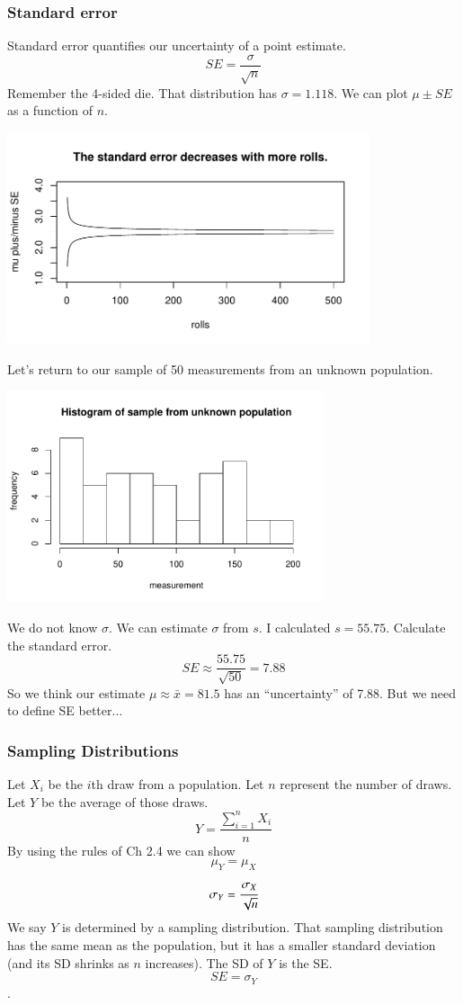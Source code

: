 \begin{frame}
\frametitle{Standard error}
Standard error quantifies our uncertainty of a point estimate.
$$SE = \frac{\sigma}{\sqrt{n}} $$
\pause
Remember the 4-sided die. That distribution has $\sigma = 1.118$. We can plot $\mu \pm SE$ as a function of $n$.
\begin{center}
\includegraphics[width=0.8\textwidth]{4-1_var_in_est/figures/running_mean_4sided_die/running_die_SE.pdf}
\end{center}
\end{frame}


\begin{frame}
Let's return to our sample of 50 measurements from an unknown population.
\begin{center}
\includegraphics[width=0.7\textwidth]{4-1_var_in_est/figures/running_mean_4sided_die/weight_hist.pdf}
\end{center}
We do not know $\sigma$. \pause We can estimate $\sigma$ from $s$. \pause I calculated $s=55.75$.
Calculate the standard error.
$$SE \approx \frac{55.75}{\sqrt{50}} = 7.88$$
\pause
So we think our estimate $\mu \approx \bar{x} = 81.5$ has an ``uncertainty'' of 7.88. But we need to define SE better...
\end{frame}


\begin{frame}
\frametitle{Sampling Distributions}
Let $X_i$ be the $i$th draw from a population. Let $n$ represent the number of draws. Let $Y$ be the average of those draws.
$$Y = \frac{\sum\limits_{i=1}^n X_i}{n}$$
By using the rules of Ch 2.4 we can show
$$\mu_Y = \mu_X$$
$$\sigma_{Y} = \cfrac{\sigma_X}{\sqrt{n}} $$
We say $Y$ is determined by a sampling distribution. That sampling distribution has the same mean as the population, but it has a smaller standard deviation (and its SD shrinks as $n$ increases). The SD of $Y$ is the SE.
 $$SE = \sigma_Y$$. 
\end{frame}


